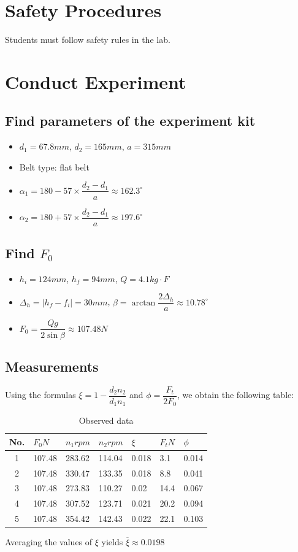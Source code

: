 \section{Safety Procedures}
Students must follow safety rules in the lab.

\section{Conduct Experiment}
\subsection{Find parameters of the experiment kit}
	\begin{itemize}
		\item $ d_1 = 67.8\unit{mm} $, $ d_2 = 165\unit{mm} $, $ a = 315\unit{mm} $
		\item Belt type: flat belt
		\item $ \alpha_1 = 180 - 57\times\dfrac{d_2-d_1}{a} \approx 162.3^{\circ}$
		\item $ \alpha_2 = 180 + 57\times\dfrac{d_2-d_1}{a} \approx 197.6^{\circ}$
	\end{itemize}
\subsection{Find $ F_0 $}
	\begin{itemize}
		\item $ h_i = 124\unit{mm}$, $ h_f = 94\unit{mm} $, $ Q = 4.1\unit{kg\cdot F} $
		\item $ \Delta_h=|h_f-f_i|=30\unit{mm} $, $ \beta=\arctan\dfrac{2\Delta_h}{a} \approx 10.78^{\circ}$
		\item $ F_0 = \dfrac{Qg}{2\sin\beta} \approx 107.48\unit{N}$
	\end{itemize}
\subsection{Measurements}
Using the formulas $ \xi=1-\dfrac{d_2n_2}{d_1n_1} $ and $ \phi=\dfrac{F_t}{2F_0} $, we obtain the following table:
\begin{table}[ht]
	\centering
	\begin{tabular}{|c|l|l|l|l|l|l|}\hline
		No. & $ F_0\unit{N}$ & $ n_1\unit{rpm} $ & $ n_2\unit{rpm} $ & $ \xi $ & $ F_t\unit{N} $ & $ \phi $\\\hline
		1 & 107.48 & 283.62 & 114.04 & 0.018 & 3.1 & 0.014\\\hline
		2 & 107.48 & 330.47 & 133.35 & 0.018 & 8.8 & 0.041\\\hline
		3 & 107.48 & 273.83 & 110.27 & 0.02 & 14.4 & 0.067\\\hline
		4 & 107.48 & 307.52 & 123.71 & 0.021 & 20.2 & 0.094\\\hline
		5 & 107.48 & 354.42 & 142.43 & 0.022 & 22.1 & 0.103\\\hline
	\end{tabular}
	\caption{Observed data}
\end{table}
Averaging the values of $ \xi $ yields $ \overline{\xi} \approx 0.0198$
